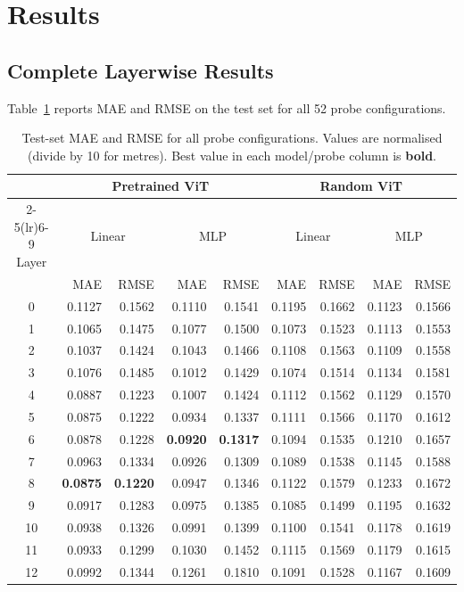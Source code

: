 \documentclass[11pt,a4paper]{article}
\begin{document}
\section{Results}

\subsection{Complete Layerwise Results}

Table~\ref{tab:full_results} reports MAE and RMSE on the test set for all 52
probe configurations.

\begin{table}[H]
\centering
\caption{Test-set MAE and RMSE for all probe configurations.  Values are
normalised (divide by 10 for metres).  Best value in each model/probe
column is \textbf{bold}.}
\label{tab:full_results}
\small
\begin{tabular}{c|rr|rr|rr|rr}
\toprule
 & \multicolumn{4}{c|}{\textbf{Pretrained ViT}} & \multicolumn{4}{c}{\textbf{Random ViT}} \\
\cmidrule(lr){2-5}\cmidrule(lr){6-9}
Layer & \multicolumn{2}{c|}{Linear} & \multicolumn{2}{c|}{MLP} & \multicolumn{2}{c|}{Linear} & \multicolumn{2}{c}{MLP} \\
 & MAE & RMSE & MAE & RMSE & MAE & RMSE & MAE & RMSE \\
\midrule
0  & 0.1127 & 0.1562 & 0.1110 & 0.1541 & 0.1195 & 0.1662 & 0.1123 & 0.1566 \\
1  & 0.1065 & 0.1475 & 0.1077 & 0.1500 & 0.1073 & 0.1523 & 0.1113 & 0.1553 \\
2  & 0.1037 & 0.1424 & 0.1043 & 0.1466 & 0.1108 & 0.1563 & 0.1109 & 0.1558 \\
3  & 0.1076 & 0.1485 & 0.1012 & 0.1429 & 0.1074 & 0.1514 & 0.1134 & 0.1581 \\
4  & 0.0887 & 0.1223 & 0.1007 & 0.1424 & 0.1112 & 0.1562 & 0.1129 & 0.1570 \\
5  & 0.0875 & 0.1222 & 0.0934 & 0.1337 & 0.1111 & 0.1566 & 0.1170 & 0.1612 \\
6  & 0.0878 & 0.1228 & \textbf{0.0920} & \textbf{0.1317} & 0.1094 & 0.1535 & 0.1210 & 0.1657 \\
7  & 0.0963 & 0.1334 & 0.0926 & 0.1309 & 0.1089 & 0.1538 & 0.1145 & 0.1588 \\
8  & \textbf{0.0875} & \textbf{0.1220} & 0.0947 & 0.1346 & 0.1122 & 0.1579 & 0.1233 & 0.1672 \\
9  & 0.0917 & 0.1283 & 0.0975 & 0.1385 & 0.1085 & 0.1499 & 0.1195 & 0.1632 \\
10 & 0.0938 & 0.1326 & 0.0991 & 0.1399 & 0.1100 & 0.1541 & 0.1178 & 0.1619 \\
11 & 0.0933 & 0.1299 & 0.1030 & 0.1452 & 0.1115 & 0.1569 & 0.1179 & 0.1615 \\
12 & 0.0992 & 0.1344 & 0.1261 & 0.1810 & 0.1091 & 0.1528 & 0.1167 & 0.1609 \\
\bottomrule
\end{tabular}
\end{table}
\end{document}
